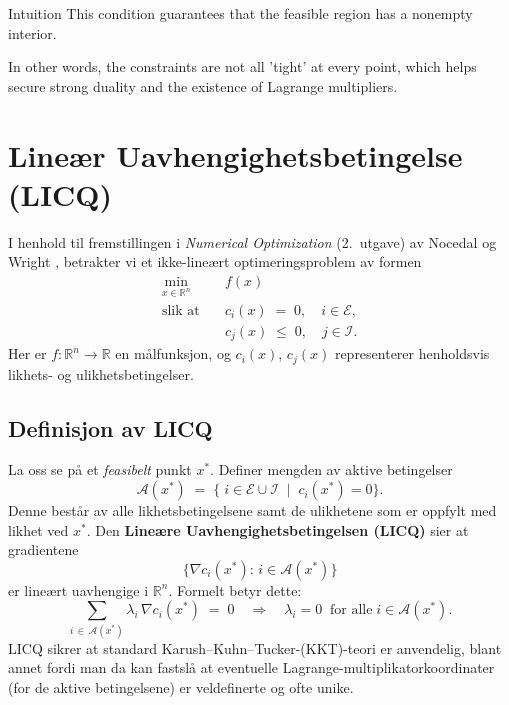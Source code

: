 \begin{remark}{Intuition}{}
  This condition guarantees that the feasible region has a nonempty interior.

  In other words, the constraints are not all 'tight' at every point, which helps secure strong duality and the existence of Lagrange multipliers.
\end{remark}

\section{Lineær Uavhengighetsbetingelse (LICQ)}
\label{sec:LICQ}

I henhold til fremstillingen i \emph{Numerical Optimization} (2.~utgave) av Nocedal og Wright \cite[Kapittel~12]{NocedalWright}, betrakter vi et ikke-lineært optimeringsproblem av formen
\begin{equation}
\label{eq:opt_problem}
\begin{aligned}
\min_{x \in \mathbb{R}^n}\quad & f(x) \\
\text{slik at}\quad
& c_i(x) \;=\; 0, \quad i \in \mathcal{E},\\[4pt]
& c_j(x) \;\le\; 0, \quad j \in \mathcal{I}.
\end{aligned}
\end{equation}
Her er \(f : \mathbb{R}^n \to \mathbb{R}\) en målfunksjon, og \(c_i(x)\), \(c_j(x)\) representerer henholdsvis likhets- og ulikhetsbetingelser.

\subsection{Definisjon av LICQ}

La oss se på et \emph{feasibelt} punkt \(x^*\). Definer mengden av aktive betingelser
\[
\mathcal{A}(x^*) \;=\; \{\; i \in \mathcal{E} \cup \mathcal{I} \;\mid\; c_i(x^*) = 0 \}.
\]
Denne består av alle likhetsbetingelsene samt de ulikhetene som er oppfylt med likhet ved \(x^*\). 
Den \textbf{Lineære Uavhengighetsbetingelsen (LICQ)} sier at gradientene
\[
\{\nabla c_i(x^*) :\, i \in \mathcal{A}(x^*)\}
\]
er lineært uavhengige i \(\mathbb{R}^n\). Formelt betyr dette:
\[
\sum_{i \,\in\, \mathcal{A}(x^*)} \lambda_i \,\nabla c_i(x^*) \;=\; 0
\quad \Longrightarrow \quad
\lambda_i = 0 \;\;\text{for alle}\; i \in \mathcal{A}(x^*).
\]
LICQ sikrer at standard Karush--Kuhn--Tucker-(KKT)-teori er anvendelig, blant annet fordi man da kan fastslå at eventuelle Lagrange-multiplikatorkoordinater (for de aktive betingelsene) er veldefinerte og ofte unike.

